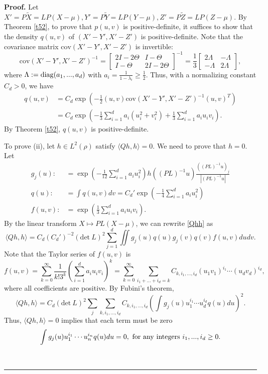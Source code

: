 \documentclass[]{elsarticle}
\newcommand{\cov}{\mathrm{cov}}
\newcommand{\innerp}[2]{\langle #1,#2 \rangle}
\newenvironment{proof}[1][Proof]{\noindent\textbf{#1.} }{\ \rule{0.5em}{0.5em}}
\numberwithin{equation}{section}
\numberwithin{theorem}{section}
\begin{document}
\begin{proof}
Let $X'= P\tilde X = LP(X-\mu), Y' = P\tilde Y = LP(Y-\mu), Z' = P\tilde Z = LP(Z-\mu)$. By Theorem \ref{t52}, to  prove that $p(u,v)$ is positive-definite, it suffices to show that the density $q(u,v)$ of $(X'-Y', X'-Z')$ is positive-definite. 
Note that the covariance matrix $\cov(X'-Y',X'-Z')$ is invertible:  
\[\cov(X'-Y',X'-Z')^{-1}=\begin{bmatrix}2I-2\Theta& I-\Theta\\I-\Theta & 2I-2\Theta\end{bmatrix}^{-1} = \frac13\begin{bmatrix}2\Lambda & -\Lambda\\
-\Lambda& 2\Lambda\end{bmatrix},\]
where $\Lambda:={\rm{diag}}(a_1,...,a_d)$ with $a_i= \frac1{1-\lambda_i}\geq \tfrac12$. 
Thus, with a normalizing constant $C_d>0$, we have
\begin{align*}
q(u,v) & =  C_d\exp\left(-\tfrac12(u,v)\cov(X'-Y',X'-Z')^{-1}(u,v)^T\right) \\
& =C_d\exp\left( -\tfrac13\sum_{i=1}^d a_i ( u_i^2 +  v_i^2) +\tfrac13 \sum_{i=1}^d a_i u_iv_i \right).
\end{align*}
 By Theorem \ref{t52},  $q(u,v)$ is positive-definite. 

\bigskip
To prove  (ii), let $h\in L^2(\rho)$ satisfy $\innerp{Qh}{h}=0$. We need to prove that $h=0$. Let 
\begin{align*}
g_j(u):&=\exp\left(-\frac1{12}\sum_{i=1}^d a_i u_i^2 \right) h((PL)^{-1}u)\frac{((PL)^{-1}u)_j}{|(PL)^{-1}u|} \\
q(u):&=\int q(u,v)dv =C_d'\exp\left(-\frac14\sum_{i=1}^da_iu_i^2\right) \\
f(u,v):&=\exp\left(\frac13\sum_{i=1}^d a_i u_iv_i\right).
\end{align*}
By the linear transform $X\mapsto PL(X-\mu)$, we can rewrite \eqref{Qhh} as
\[\innerp{Qh}{h}=C_d(C_d')^{-2}(\mathrm{det}\ L)^2\sum_{j=1}^d\iint  g_j(u)q(u) g_j(v)q(v)f(u,v)dudv.\]
Note that the Taylor series of  $f(u,v)$ is 
\[f(u,v)=\sum_{k=0}^\infty\frac1{k!3^k}(\sum_{i=1}^da_iu_iv_i)^k=\sum_{k=0}^\infty\sum_{i_1+...+i_d=k}C_{k,i_1,...,i_d} (u_1v_1)^{i_1}\cdots(u_dv_d)^{i_d},\]
where all coefficients are positive. 
By Fubini's theorem, 
\begin{equation}\label{coef}
  \innerp{Qh}{h}=C_d(\mathrm {det}\ L)^2\sum_j\sum_{k,i_1,...,i_d} C_{k,i_1,...,i_d}\left(\int  g_j(u) u_1^{i_1}\cdots u_d^{i_d}q(u)du\right)^2.
\end{equation}
Thus, $\innerp{Qh}{h} =0$ implies that each term must be zero
\[\int  g_j(u)u_1^{i_1}\cdots u_n^{i_n} q(u) du=0,\ {\rm for\  any\ integers}\ i_1,...,i_d\ge0.\]


\end{proof}
\end{document}
